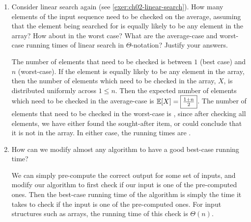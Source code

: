 \documentclass[Chapter02]{subfiles}
\begin{document}
\begin{enumerate}[leftmargin=\labelsep]
		\item Consider linear search again (see \cref{exer:ch02-linear-search}). How many elements of the input sequence need to be checked on the average, assuming that the element being searched for is equally likely to be any element in the array? How about in the worst case? What are the average-case and worst-case running times of linear search in $\Theta$-notation? Justify your answers.
		\begin{answer}
			The number of elements that need to be checked is between $1$ (best case) and $n$ (worst-case). If the element is equally likely to be any element in the array, then the number of elements which need to be checked in the array, $X$, is distributed uniformly across $1 \leq n$. Then the expected number of elements which need to be checked in the average-case is $\mathbb{E}[X] = \fbox{$\frac{1 + n}{2}$}$. The number of elements that need to be checked in the worst-case is , since after checking all elements, we have either found the sought-after item, or could conclude that it is not in the array. In either case, the running times are .
		\end{answer}

		\item How can we modify almost any algorithm to have a good best-case running time?
		\begin{answer}
			We can simply pre-compute the correct output for some set of inputs, and modify our algorithm to first check if our input is one of the pre-computed ones. Then the best-case running time of the algorithm is simply the time it takes to check if the input is one of the pre-computed ones. For input structures such as arrays, the running time of this check is $\Theta(n)$.
		\end{answer}

	\end{enumerate}
\end{document}
